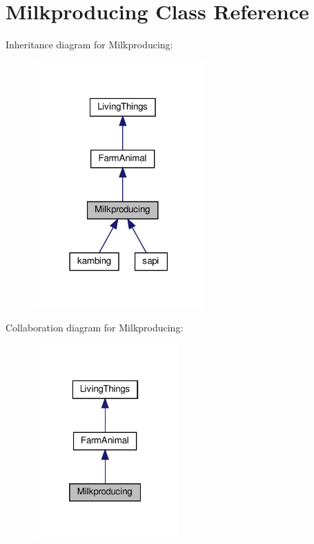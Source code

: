 \hypertarget{classMilkproducing}{}\section{Milkproducing Class Reference}
\label{classMilkproducing}


Inheritance diagram for Milkproducing\+:
\nopagebreak
\begin{figure}[H]
\begin{center}
\leavevmode
\includegraphics[width=186pt]{classMilkproducing__inherit__graph}
\end{center}
\end{figure}


Collaboration diagram for Milkproducing\+:
\nopagebreak
\begin{figure}[H]
\begin{center}
\leavevmode
\includegraphics[width=157pt]{classMilkproducing__coll__graph}
\end{center}
\end{figure}
